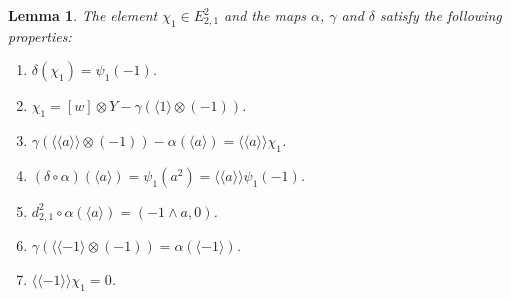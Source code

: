\documentclass[10pt,a4paper]{amsart}
\newtheorem{lem}{Lemma}
\newcommand{\Lan}{\langle \! \langle}
\newcommand{\Ran}{\rangle \! \rangle}
\newcommand{\lan}{\langle}
\newcommand{\ran}{\rangle}
\begin{document}
\begin{lem}\label{alpha-gam-chi}
    The element $\chi_1\in E^2_{2,1}$ and the maps $\alpha$, $\gamma$ and $\delta$ satisfy the following properties:
    \begin{enumerate}
        \item $\delta(\chi_1)=\psi_1(-1)$.
        \item $\chi_1=[w]\otimes Y-\gamma(\lan 1\ran\otimes (-1))$.
        \item $\gamma(\Lan a\Ran\otimes (-1))-\alpha(\lan a\ran)=\Lan a\Ran\chi_1$.
        \item $(\delta\circ\alpha)(\lan a\ran)=\psi_1(a^2)=\Lan a\Ran\psi_1(-1)$.
        \item $d^2_{2,1}\circ\alpha(\lan a\ran)=(-1\wedge a,0)$.
        \item $\gamma(\Lan -1\ran\otimes(-1))=\alpha(\lan -1\ran)$.
        \item $\Lan -1\Ran\chi_1=0$.
    \end{enumerate} 
\end{lem}
\end{document}
